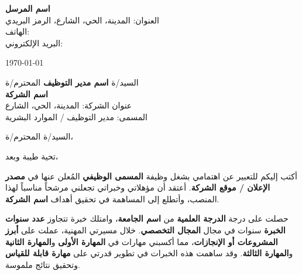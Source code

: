 \documentclass[12pt,a4paper]{article}
\begin{document}
\begin{flushright}
{\large\bfseries اسم المرسل}\\[0.2em]
العنوان: المدينة، الحي، الشارع، الرمز البريدي\\[0.2em]
الهاتف: \\[0.2em]
البريد الإلكتروني: 
\end{flushright}

\vspace{1em}

\begin{flushright}
\today
\end{flushright}

\vspace{1em}

\begin{flushright}
السيد/ة \textbf{اسم مدير التوظيف} المحترم/ة\\[0.2em]
\textbf{اسم الشركة}\\[0.2em]
عنوان الشركة: المدينة، الحي، الشارع\\[0.2em]
المسمى: مدير التوظيف / الموارد البشرية
\end{flushright}

\vspace{1em}

\begin{flushright}
السيد/ة المحترم/ة،
\end{flushright}

\vspace{0.5em}

تحية طيبة وبعد،

أكتب إليكم للتعبير عن اهتمامي بشغل وظيفة \textbf{المسمى الوظيفي} المُعلن عنها في \textbf{مصدر الإعلان / موقع الشركة}. أعتقد أن مؤهلاتي وخبراتي تجعلني مرشحاً مناسباً لهذا المنصب، وأتطلع إلى المساهمة في تحقيق أهداف \textbf{اسم الشركة}.

حصلت على درجة \textbf{الدرجة العلمية} من \textbf{اسم الجامعة}، وامتلك خبرة تتجاوز \textbf{عدد سنوات الخبرة} سنوات في مجال \textbf{المجال التخصصي}. خلال مسيرتي المهنية، عملت على \textbf{أبرز المشروعات أو الإنجازات}، مما أكسبني مهارات في \textbf{المهارة الأولى} و\textbf{المهارة الثانية} و\textbf{المهارة الثالثة}. وقد ساهمت هذه الخبرات في تطوير قدرتي على \textbf{مهارة قابلة للقياس} وتحقيق نتائج ملموسة.
\end{document}
